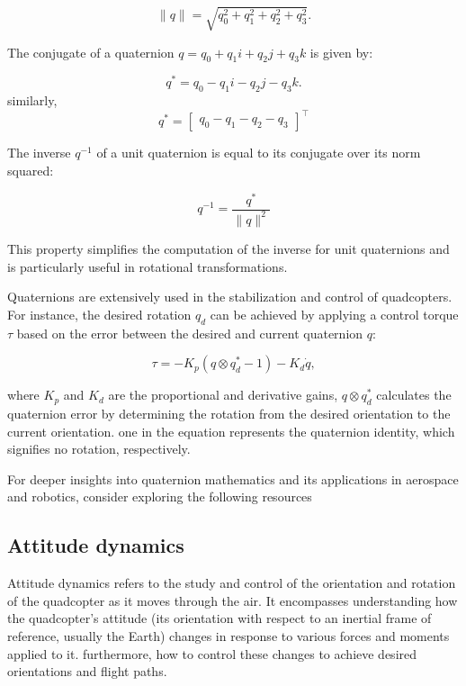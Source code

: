 \documentclass{report}
\begin{document}
\begin{equation}
\|q\| = \sqrt{q_0^2 + q_1^2 + q_2^2 + q_3^2}.
\end{equation}

The conjugate of a quaternion \( q = q_0 + q_1i + q_2j + q_3k \) is given by:

\begin{equation}
q^* = q_0 - q_1i - q_2j - q_3k.
\end{equation}
similarly,
\begin{equation}
q^* = \begin{bmatrix} q_0 - q_1 - q_2 - q_3\end{bmatrix}^\intercal
\end{equation}

The inverse \( q^{-1} \) of a unit quaternion is equal to its conjugate over its
norm squared:

\begin{equation}
q^{-1} = \frac{q^*}{\|q\| ^2}
\end{equation}

This property simplifies the computation of the inverse for unit quaternions and
is particularly useful in rotational transformations.

Quaternions are extensively used in the stabilization and control of
quadcopters. For instance, the desired rotation \( q_d \) can be achieved by
applying a control torque \( \tau \) based on the error between the desired and
current quaternion \( q \):

\begin{equation}
  \tau = -K_p (q \otimes q_d^* - 1) - K_d \dot{q},
\end{equation}

\noindent
where \( K_p \) and \( K_d \) are the proportional and derivative gains, \(q \otimes q_d^*\) calculates the quaternion error by determining the rotation from the desired orientation to the current orientation. one in the equation represents the quaternion identity, which signifies no rotation, respectively.

For deeper insights into quaternion mathematics and its applications in
aerospace and robotics, consider exploring the following resources
\cite{Kuipers1999} \cite{quaternion_curves}
\cite{QuaternionBasedAttitudeControl}

\subsection{Attitude dynamics}
Attitude dynamics refers to the study and control of the orientation and
rotation of the quadcopter as it moves through the air. It encompasses
understanding how the quadcopter's attitude (its orientation with respect to an
inertial frame of reference, usually the Earth) changes in response to various
forces and moments applied to it. furthermore, how to control these changes to
achieve desired orientations and flight paths.
\end{document}
